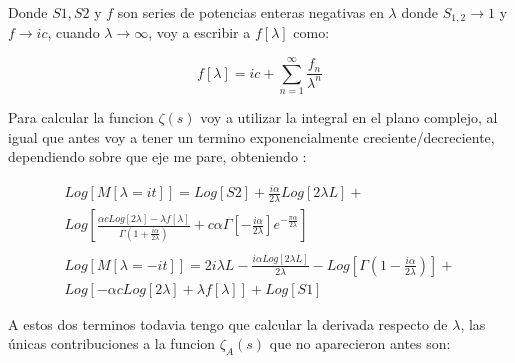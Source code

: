 Donde $S1,S2$ y $f$ son series de potencias enteras negativas en $\lambda$ donde $S _{1,2} \rightarrow 1$ y $f \rightarrow i c$, cuando $\lambda \rightarrow \infty$, voy a escribir a $f[\lambda]$ como:

\begin{equation}
f[\lambda] = i c + \sum _{n=1} ^{\infty} \frac{f _n}{\lambda ^n}
\end{equation}



Para calcular la funcion $\zeta (s) $ voy a utilizar la integral en el plano complejo, al igual que antes voy a tener un termino exponencialmente creciente/decreciente, dependiendo sobre que eje me pare, obteniendo : 

\begin{equation}
\begin{array}{c}
Log[M[\lambda = i t]] = 
Log[S2] +
\frac{i \alpha}{2 \lambda} Log[2 \lambda L] +  \\
Log[
	\frac{\alpha c Log[2 \lambda] - \lambda f[\lambda] }{\Gamma (1 + \frac{i \alpha}{ 2 \lambda})} + 
	c \alpha \Gamma \left[- \frac{i \alpha}{2 \lambda} \right] 
	e ^{- \frac{ \pi \alpha}{2 \lambda}} ] \\ \\
	
Log[M[\lambda = - i t]] = 
2 i \lambda L -
\frac{i \alpha Log[2 \lambda L]}{2 \lambda} -
Log[\Gamma (1- \frac{i \alpha}{2 \lambda}) ] + \\
Log[
	- \alpha c Log[2 \lambda] +
	\lambda f[\lambda]
	] +
Log[S1]
\end{array}
\end{equation}


A estos dos terminos todavia tengo que calcular la derivada respecto de $\lambda$, las únicas contribuciones a la funcion $\zeta _A (s)$ que no aparecieron antes son:


